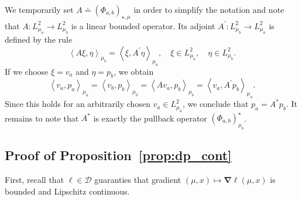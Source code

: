 \documentclass[sn-mathphys-num]{sn-jnl}
\numberwithin{equation}{section}
\theoremstyle{mythm}
\theoremstyle{mydef}
\begin{document}
We temporarily set \( A\doteq (\Phi_{a,b})_{\star,\mu}\) in order to simplify the notation and note that \( A\colon L^2_{\mu_{a}}\to L^2_{\mu_b} \) is a linear bounded operator.
Its adjoint \( A^{\prime}\colon L^2_{\mu_b} \to L^2_{\mu_{a}} \) is defined by the rule
\[
  \left\langle A \xi, \eta\right\rangle_{\mu_b} = \left< \xi, A^{\prime}\eta \right>_{\mu_a},\quad \xi\in L^2_{\mu_a},\quad \eta\in L^2_{\mu_b}.
\]
If we choose \( \xi = v_a \) and \( \eta = p_b \), we obtain
\[
  \left\langle v_{a},p_a\right\rangle_{\mu_a} = \left\langle v_{b},p_b\right\rangle_{\mu_b} =
  \left\langle Av_{a},p_b\right\rangle_{\mu_b} = \left\langle v_{a},A^{\prime}p_b\right\rangle_{\mu_a}.
\]
Since this holds for an arbitrarily chosen \( v_a\in L^2_{\mu_a} \), we conclude that \( p_a = A^{*}p_b \).
It remains to note that \( A^{*} \) is exactly the pullback operator \( (\Phi_{a,b})^{\star}_{\mu_b} \).

\subsection{Proof of Proposition~\ref{prop:dp_cont}}\label{app:pr-dp_cont}

  First, recall that \( \ell\in \bm{\mathcal D} \) guaranties that gradient \( (\mu,x)\mapsto\bm\nabla\ell(\mu,x) \) is bounded and Lipschitz continuous.
\end{document}
